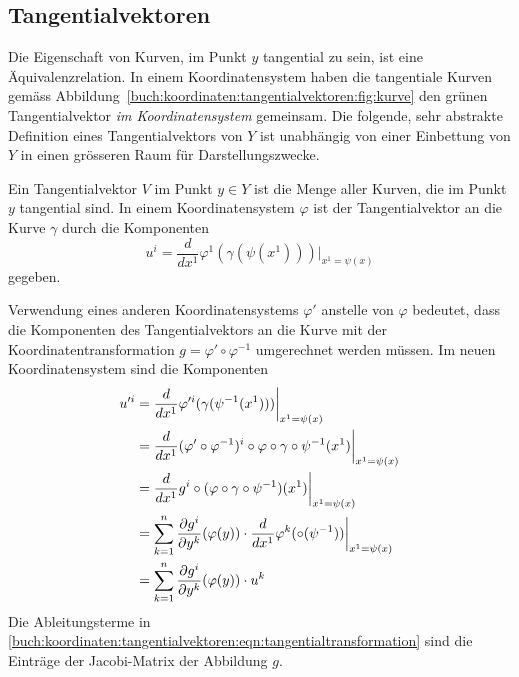 \subsection{Tangentialvektoren}
Die Eigenschaft von Kurven, im Punkt $y$ tangential zu sein, ist
eine Äquivalenzrelation.
In einem Koordinatensystem haben die tangentiale Kurven gemäss
Abbildung~\ref{buch:koordinaten:tangentialvektoren:fig:kurve}
den grünen Tangentialvektor {\em im Koordinatensystem} gemeinsam.
Die folgende, sehr abstrakte Definition eines Tangentialvektors
von $Y$ ist unabhängig von einer Einbettung von $Y$ in einen
grösseren Raum für Darstellungszwecke.

\begin{definition}[Tangentialvektor]
\label{buch:koordinaten:tangentialvektoren:def:tangentialvektor}
Ein Tangentialvektor $V$ im Punkt $y\in Y$ ist die Menge aller Kurven, die
im Punkt $y$ tangential sind.
In einem Koordinatensystem $\varphi$ ist der Tangentialvektor an die Kurve
$\gamma$ durch die Komponenten
\[
u^i = \frac{d}{dx^1} \varphi^1(\gamma(\psi(x^1))) \bigg|_{x^1 = \psi(x)}
\]
gegeben.
\end{definition}

Verwendung eines anderen Koordinatensystems $\varphi'$ anstelle von
$\varphi$ bedeutet, dass die Komponenten des Tangentialvektors
an die Kurve mit der Koordinatentransformation
$g=\varphi'\circ\varphi^{-1}$ umgerechnet werden müssen.
Im neuen Koordinatensystem sind die Komponenten
\begin{align}
u^{\prime i}
&=
\frac{d}{dx^1}
\varphi^{\prime i}(\gamma(\psi^{-1}(x^1))) \bigg|_{x^1=\psi(x)}
\notag
\\
&=
\frac{d}{dx^1}
(\varphi'\circ\varphi^{-1})^i\circ \varphi\circ\gamma\circ\psi^{-1}(x^1)
\bigg|_{x^1=\psi(x)}
\notag
\\
&=
\frac{d}{dx^1} g^i\circ(\varphi\circ\gamma\circ\psi^{-1})(x^1)
\bigg|_{x^1=\psi(x)}
\notag
\\
&=
\sum_{k=1}^n
\frac{\partial g^i}{\partial y^k}(\varphi(y))
\cdot
\frac{d}{dx^1}\varphi^k(\circ(\psi^{-1})) 
\bigg|_{x^1=\psi(x)}
\notag
\\
&=
\sum_{k=1}^n
\frac{\partial g^i}{\partial y^k}(\varphi(y))
\cdot
u^k
\label{buch:koordinaten:tangentialvektoren:eqn:tangentialtransformation}
\end{align}
Die Ableitungsterme in
\eqref{buch:koordinaten:tangentialvektoren:eqn:tangentialtransformation}
sind die Einträge der Jacobi-Matrix der Abbildung $g$.

